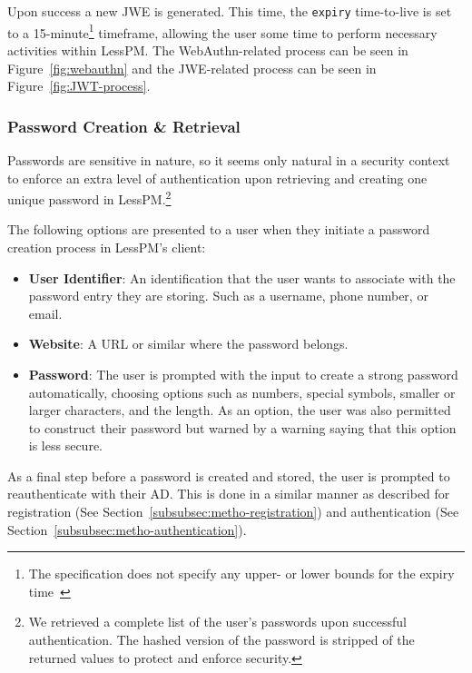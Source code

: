 Upon success a new JWE is generated.
This time, the \texttt{expiry} time-to-live is set to a 15-minute\footnote{
  The specification does not specify any upper- or lower bounds for the
  expiry time~\cite{RFC7519}
}
timeframe, allowing the user some time to perform necessary activities
within LessPM\@.
The WebAuthn-related process can be seen in Figure~\ref{fig:webauthn} and the
JWE-related process can be seen in Figure~\ref{fig:JWT-process}.

\subsubsection{Password Creation \& Retrieval}\label{subsubsec:creation-and-retrieval}
Passwords are sensitive in nature, so it seems only natural in a security
context to enforce an extra level of authentication upon retrieving and creating
one unique password in LessPM.\footnote{
  We retrieved a complete list of the user's passwords upon successful authentication.
  The hashed version of the password is stripped of the returned values to protect and enforce security.
}

The following options are presented to a user when they initiate a password
creation process in LessPM's client:

\begin{itemize}
  \item \textbf{User Identifier}: An identification that the user wants to
  associate with the password entry they are storing.
  Such as a username, phone number, or email.
  \item \textbf{Website}: A URL or similar where the password belongs.
  \item \textbf{Password}: The user is prompted with the input to create a
  strong password automatically, choosing options such as numbers, special
  symbols, smaller or larger characters, and the length.
  As an option, the user was also permitted to construct their password but
  warned by a warning saying that this option is less secure.
\end{itemize}

As a final step before a password is created and stored, the user is prompted to
reauthenticate with their AD\@.
This is done in a similar manner as described for registration (See
Section~\ref{subsubsec:metho-registration}) and authentication (See
Section~\ref{subsubsec:metho-authentication}).

